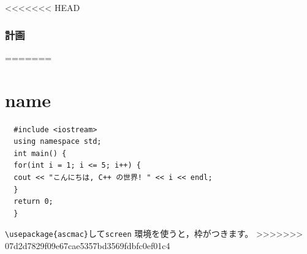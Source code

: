 \documentclass[a4paper,12pt]{jsarticle}
\begin{document}




\appendix
<<<<<<< HEAD
\def\thesection{補完A}
\section{計画}

=======

\part{name}
\begin{verbatim}
  #include <iostream>
  using namespace std;
  int main() {
  for(int i = 1; i <= 5; i++) {
  cout << "こんにちは, C++ の世界! " << i << endl;
  }
  return 0;
  }
\end{verbatim}
\verb|\usepackage{ascmac}|して\verb|screen| 環境を使うと，枠がつきます。
>>>>>>> 07d2d7829f09e67cae5357bd3569fdbfc0ef01c4
\end{document}
